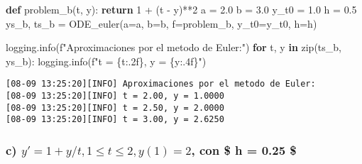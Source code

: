 \documentclass[
  letterpaper,
  DIV=11,
  numbers=noendperiod]{scrartcl}
\newenvironment{Shaded}{\begin{snugshade}}{\end{snugshade}}
\newcommand{\BuiltInTok}[1]{\textcolor[rgb]{0.00,0.23,0.31}{#1}}
\newcommand{\ControlFlowTok}[1]{\textcolor[rgb]{0.00,0.23,0.31}{\textbf{#1}}}
\newcommand{\DecValTok}[1]{\textcolor[rgb]{0.68,0.00,0.00}{#1}}
\newcommand{\FloatTok}[1]{\textcolor[rgb]{0.68,0.00,0.00}{#1}}
\newcommand{\KeywordTok}[1]{\textcolor[rgb]{0.00,0.23,0.31}{\textbf{#1}}}
\newcommand{\NormalTok}[1]{\textcolor[rgb]{0.00,0.23,0.31}{#1}}
\newcommand{\OperatorTok}[1]{\textcolor[rgb]{0.37,0.37,0.37}{#1}}
\newcommand{\SpecialCharTok}[1]{\textcolor[rgb]{0.37,0.37,0.37}{#1}}
\newcommand{\SpecialStringTok}[1]{\textcolor[rgb]{0.13,0.47,0.30}{#1}}
\begin{document}
\begin{Shaded}
\begin{Highlighting}[]
\KeywordTok{def}\NormalTok{ problem\_b(t, y):}
    \ControlFlowTok{return} \DecValTok{1} \OperatorTok{+}\NormalTok{ (t }\OperatorTok{{-}}\NormalTok{ y)}\OperatorTok{**}\DecValTok{2}
\NormalTok{a }\OperatorTok{=} \FloatTok{2.0}  
\NormalTok{b }\OperatorTok{=} \FloatTok{3.0}  
\NormalTok{y\_t0 }\OperatorTok{=} \FloatTok{1.0}  
\NormalTok{h }\OperatorTok{=} \FloatTok{0.5}  
\NormalTok{ys\_b, ts\_b }\OperatorTok{=}\NormalTok{ ODE\_euler(a}\OperatorTok{=}\NormalTok{a, b}\OperatorTok{=}\NormalTok{b, f}\OperatorTok{=}\NormalTok{problem\_b, y\_t0}\OperatorTok{=}\NormalTok{y\_t0, h}\OperatorTok{=}\NormalTok{h)}

\NormalTok{logging.info(}\SpecialStringTok{f"Aproximaciones por el metodo de Euler:"}\NormalTok{)}
\ControlFlowTok{for}\NormalTok{ t, y }\KeywordTok{in} \BuiltInTok{zip}\NormalTok{(ts\_b, ys\_b):}
\NormalTok{    logging.info(}\SpecialStringTok{f"t = }\SpecialCharTok{\{}\NormalTok{t}\SpecialCharTok{:.2f\}}\SpecialStringTok{, y = }\SpecialCharTok{\{}\NormalTok{y}\SpecialCharTok{:.4f\}}\SpecialStringTok{"}\NormalTok{)}
\end{Highlighting}
\end{Shaded}

\begin{verbatim}
[08-09 13:25:20][INFO] Aproximaciones por el metodo de Euler:
[08-09 13:25:20][INFO] t = 2.00, y = 1.0000
[08-09 13:25:20][INFO] t = 2.50, y = 2.0000
[08-09 13:25:20][INFO] t = 3.00, y = 2.6250
\end{verbatim}

\subsubsection{\texorpdfstring{c)
\(y' = 1+y/t,1 \leq t \leq 2 ,  y(1) = 2\), con \$ h = 0.25
\$}{c) y\textquotesingle{} = 1+y/t,1 \textbackslash leq t \textbackslash leq 2 ,  y(1) = 2, con \$ h = 0.25 \$}}\label{c-y-1yt1-leq-t-leq-2-y1-2-con-h-0.25}
\end{document}
